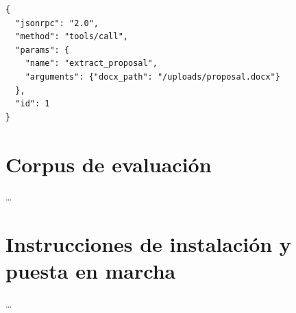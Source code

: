 \begin{lstlisting}
{
  "jsonrpc": "2.0",
  "method": "tools/call",
  "params": {
    "name": "extract_proposal",
    "arguments": {"docx_path": "/uploads/proposal.docx"}
  },
  "id": 1
}
\end{lstlisting}



\chapter{Corpus de evaluación}
\label{anexo:corpus}

\ldots

\chapter{Instrucciones de instalación y puesta en marcha}
\label{anexo:instalacion}

%
%
%
%
\ldots
